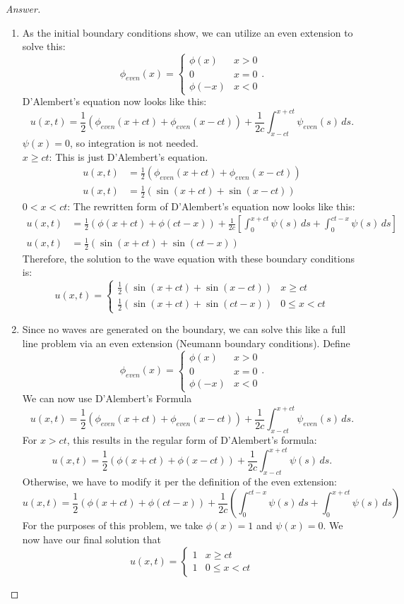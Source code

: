 \documentclass{article}
\theoremstyle{definition}
\renewcommand\qedsymbol{$\blacksquare$}
\newenvironment{ans}{\begin{proof}[Answer]\renewcommand{\qedsymbol}{}}{\end{proof}}
\begin{document}
\begin{ans}
\begin{enumerate}[(1), start=9]
    \item As the initial boundary conditions show, we can utilize an even extension to solve this:
    \[\phi_{even}(x) = \begin{cases}
        \phi(x) & x > 0\\
        0 & x = 0\\
        \phi(-x) & x < 0
    \end{cases}.\]
    D'Alembert's equation now looks like this:
    \[u(x,t) = \frac{1}{2}(\phi_{even}(x+ct) + \phi_{even}(x-ct)) + \frac{1}{2c}\int_{x-ct}^{x+ct}\psi_{even}(s)\,ds.\]
    $\psi{(x)} = 0$, so integration is not needed.\\
    \underline{$x \geq ct$}: This is just D'Alembert's equation.
    \begin{align*}
        u(x,t) &= \frac{1}{2}(\phi_{even}(x+ct) + \phi_{even}(x-ct))\\
        u(x,t) &= \frac{1}{2}(\sin{(x+ct)} + \sin{(x-ct)})
    \end{align*}
    \underline{$0 < x < ct$}: The rewritten form of D'Alembert's equation now looks like this:
    \begin{align*}
        u(x,t) &= \frac{1}{2}(\phi(x+ct) + \phi(ct-x)) + \frac{1}{2c}\left[\int_0^{x+ct}\psi(s)\,ds + \int_0^{ct-x}\psi(s)\,ds\right]\\
        u(x,t) &= \frac{1}{2}(\sin{(x+ct)} + \sin{(ct-x)})
    \end{align*}
    Therefore, the solution to the wave equation with these boundary conditions is:
    \[\boxed{u(x,t) = \begin{cases}
        \frac{1}{2}(\sin{(x+ct)} + \sin{(x-ct)}) & x \geq ct\\
        \frac{1}{2}(\sin{(x+ct)} + \sin{(ct-x)}) & 0 \leq x < ct
    \end{cases}}\]

    \item Since no waves are generated on the boundary, we can solve this like a full line problem via an even extension (Neumann boundary conditions). Define
    \[\phi_{even}(x) = \begin{cases}
        \phi(x) & x > 0\\
        0 & x = 0\\
        \phi(-x) & x < 0
    \end{cases}.\]
    We can now use D'Alembert's Formula
    \[u(x,t) = \frac{1}{2}(\phi_{even}(x+ct) + \phi_{even}(x-ct)) + \frac{1}{2c}\int_{x-ct}^{x+ct}\psi_{even}(s)\,ds.\]
    For $x > ct$, this results in the regular form of D'Alembert's formula:
    \[u(x,t) = \frac{1}{2}(\phi(x+ct) + \phi(x-ct)) + \frac{1}{2c}\int_{x-ct}^{x+ct}\psi(s)\,ds.\]
    Otherwise, we have to modify it per the definition of the even extension:
    \[u(x,t) = \frac{1}{2}(\phi(x+ct) + \phi(ct-x)) + \frac{1}{2c}\left(\int_{0}^{ct-x}\psi(s)\,ds+\int_{0}^{x+ct} \psi(s)\,ds\right)\]
    For the purposes of this problem, we take $\phi(x) = 1$ and $\psi(x) = 0$. We now have our final solution that
    \[\boxed{u(x,t) = \begin{cases}
        1 & x \geq ct\\
        1 & 0 \leq x < ct
    \end{cases}}\]


\end{enumerate}
\end{ans}
\end{document}
